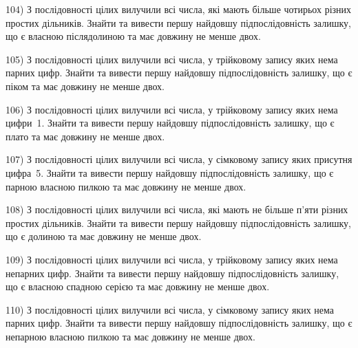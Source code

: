\documentclass[12pt, ukrainian]{article}
\begin{document}
\par
\vspace{0.9cm}
104) \space 
З послідовності цілих вилучили всі числа, які мають більше чотирьох різних простих дільників. Знайти та вивести першу найдовшу підпослідовність залишку, що є власною післядолиною та має довжину не менше двох.

\par
\vspace{0.9cm}
105) \space 
З послідовності цілих вилучили всі числа, у трійковому запису яких нема парних цифр. Знайти та вивести першу найдовшу підпослідовність залишку, що є піком та має довжину не менше двох.

\par
\vspace{0.9cm}
106) \space 
З послідовності цілих вилучили всі числа, у трійковому запису яких нема цифри~1. Знайти та вивести першу найдовшу підпослідовність залишку, що є плато та має довжину не менше двох.

\par
\vspace{0.9cm}
107) \space 
З послідовності цілих вилучили всі числа, у сімковому запису яких присутня цифра~5. Знайти та вивести першу найдовшу підпослідовність залишку, що є парною власною пилкою та має довжину не менше двох.

\par
\vspace{0.9cm}
108) \space 
З послідовності цілих вилучили всі числа, які мають не більше п'яти різних простих дільників. Знайти та вивести першу найдовшу підпослідовність залишку, що є долиною та має довжину не менше двох.

\par
\vspace{0.9cm}
109) \space 
З послідовності цілих вилучили всі числа, у трійковому запису яких нема непарних цифр. Знайти та вивести першу найдовшу підпослідовність залишку, що є власною спадною серією та має довжину не менше двох.

\par
\vspace{0.9cm}
110) \space 
З послідовності цілих вилучили всі числа, у сімковому запису яких нема парних цифр. Знайти та вивести першу найдовшу підпослідовність залишку, що є непарною власною пилкою та має довжину не менше двох.
\end{document}
